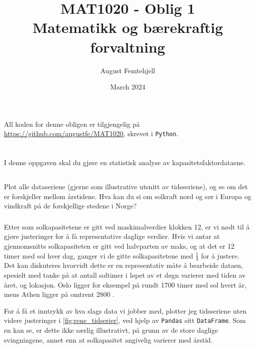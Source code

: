 \documentclass{article}
\title{MAT1020 - Oblig 1\\Matematikk og bærekraftig forvaltning}
\author{August Femtehjell}
\date{March 2024}
\begin{document}
\maketitle

\noindent
All koden for denne obligen er tilgjengelig på \url{https://github.com/augustfe/MAT1020}, skrevet i \verb|Python|.

\section{}
I denne oppgaven skal du gjøre en statistisk analyse av kapasitetsfaktordataene.

\subsection{}
Plot alle dataseriene (gjerne som illustrative utsnitt av tidsseriene), og se om det er forskjeller mellom årstidene. Hva kan du si om solkraft nord og sør i Europa og vindkraft på de forskjellige stedene i Norge?

\subsubsection{}
Etter som solkapasitetene er gitt ved maskimalverdier klokken 12, er vi nødt til å gjøre justeringer for å få representative daglige verdier.
Hvis vi antar at gjennomsnitts solkapasiteten er gitt ved halvparten av maks, og at det er 12 timer med sol hver dag, ganger vi de gitte solkapasitetene med $\frac{1}{4}$ for å justere.
Det kan diskuteres hvorvidt dette er en representativ måte å bearbeide dataen, spesielt med tanke på at antall soltimer i løpet av et døgn varierer med tiden av året, og lokasjon.
Oslo ligger for eksempel på rundt 1700 timer med sol hvert år, mens Athen ligger på omtrent 2800 \cite{soltimer}.

For å få et inntrykk av hva slags data vi jobber med, plotter jeg tidsseriene uten videre justeringer i \autoref{fig:rene_tidserier}, ved hjelp av \verb|Pandas| sitt \verb|DataFrame|.
Som en kan se, er dette ikke særlig illustrativt, på grunn av de store daglige svingningene, annet enn at solkapasitet angivelig varierer med årstid.
\end{document}
